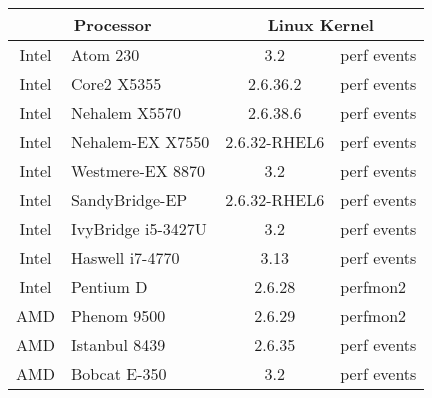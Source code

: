\begin{tabular}{|c@{ }l|c@{ }l|}

\hline
\multicolumn{2}{|c|}{Processor} &
\multicolumn{2}{|c|}{Linux Kernel} \\
\hline
\hline
Intel  & Atom 230         & 3.2 & perf events \\  %
\hline
Intel  & Core2 X5355      & 2.6.36.2 & perf events \\  %
\hline
Intel  & Nehalem X5570    & 2.6.38.6 & perf events \\  %
\hline
Intel  & Nehalem-EX X7550 & 2.6.32-RHEL6 & perf events \\  %
\hline
Intel  & Westmere-EX 8870 & 3.2 & perf events \\     %
\hline
Intel  & SandyBridge-EP   & 2.6.32-RHEL6 & perf events \\  %
\hline
Intel  & IvyBridge i5-3427U & 3.2  & perf events \\  %
\hline
Intel  & Haswell i7-4770  & 3.13   & perf events \\ %
\hline
Intel  & Pentium D        & 2.6.28 & perfmon2    \\  %
\hline
AMD    & Phenom 9500      & 2.6.29 & perfmon2    \\  %
\hline
AMD    & Istanbul 8439    & 2.6.35 & perf events \\  %
\hline
AMD    & Bobcat  E-350    & 3.2    & perf events \\  %
\hline

\end{tabular}


